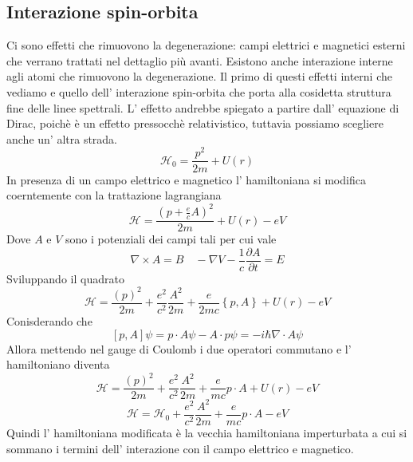\documentclass[11pt,a4paper]{article}
\theoremstyle{springer}
\theoremstyle{definition}
\theoremstyle{remark}
\begin{document}
\subsection{Interazione spin-orbita}

Ci sono effetti che rimuovono la degenerazione: campi elettrici e magnetici esterni che verrano trattati nel dettaglio più avanti. Esistono anche interazione interne agli atomi che rimuovono la degenerazione. Il primo di questi effetti interni che vediamo e quello dell' interazione spin-orbita che porta alla cosidetta struttura fine delle linee spettrali. L' effetto andrebbe spiegato a partire dall' equazione di Dirac, poichè è un effetto pressocchè relativistico, tuttavia possiamo scegliere anche un' altra strada.
\begin{equation*}
  \mathcal{H}_0 = \frac{p^2}{2m} + U(r)
\end{equation*}
In presenza di un campo elettrico e magnetico l' hamiltoniana si modifica coerntemente con la trattazione lagrangiana
\begin{equation*}
  \mathcal{H} = \frac{\left(p + \frac{e}{c}A\right)^2}{2m} + U(r) -eV
\end{equation*}
Dove $A$ e $V$ sono i potenziali dei campi tali per cui vale
\begin{equation*}
  \nabla \times{A} = B \quad -\nabla V - \frac{1}{c} \frac{\partial A}{\partial t} = E 
\end{equation*}
Sviluppando il quadrato
\begin{equation*}
  \mathcal{H} = \frac{\left(p \right)^2}{2m} + \frac{e^2}{c^2}\frac{A^2}{2m}+ \frac{e}{2mc}\left\{p,A\right\} +U(r) -eV
\end{equation*}
Conisderando che 
\begin{equation*}
  \left[p,A\right] \psi = p\cdot A \psi - A \cdot p \psi = - i\hbar \nabla \cdot A \psi
\end{equation*}
Allora mettendo nel gauge di Coulomb i due operatori commutano e l' hamiltoniano diventa
\begin{equation*}
  \mathcal{H} = \frac{\left(p \right)^2}{2m} + \frac{e^2}{c^2}\frac{A^2}{2m}+ \frac{e}{mc}p\cdot A +U(r) -eV
\end{equation*}
\begin{equation*}
  \mathcal{H} = \mathcal{H}_0+\frac{e^2}{c^2}\frac{A^2}{2m}+ \frac{e}{mc}p\cdot A -eV
\end{equation*}
Quindi l' hamiltoniana modificata è la vecchia hamiltoniana imperturbata a cui si sommano i termini dell' interazione con il campo elettrico e magnetico.
\end{document}
